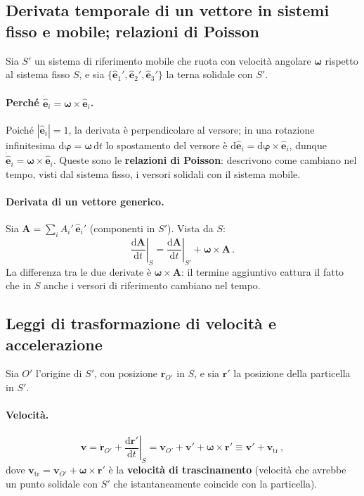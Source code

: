 \documentclass[11pt,a4paper]{article}
\renewcommand{\vec}[1]{\bm{#1}}
\newcommand{\om}{\vec{\omega}}
\theoremstyle{plain}
\theoremstyle{definition}
\theoremstyle{remark}
\begin{document}
\subsection{Derivata temporale di un vettore in sistemi fisso e mobile;
relazioni di Poisson}

Sia $S'$ un sistema di riferimento mobile che ruota con velocità angolare
$\om$ rispetto al sistema fisso $S$, e sia $\{\hat{\bm{e}}_1',\hat{\bm{e}}_2',\hat{\bm{e}}_3'\}$
la terna solidale con $S'$.

\paragraph{Perché $\dot{\hat{\bm{e}}}_i=\om\times\hat{\bm{e}}_i$.}
Poiché $|\hat{\bm{e}}_i|=1$, la derivata è perpendicolare al versore; in una
rotazione infinitesima $\mathrm{d}\vec{\varphi}=\om\,\mathrm{d}t$ lo
spostamento del versore è $\mathrm{d}\hat{\bm{e}}_i=\mathrm{d}\vec{\varphi}\times\hat{\bm{e}}_i$,
dunque $\dot{\hat{\bm{e}}}_i=\om\times\hat{\bm{e}}_i$.
Queste sono le \textbf{relazioni di Poisson}: descrivono come cambiano nel
tempo, visti dal sistema fisso, i versori solidali con il sistema mobile.

\paragraph{Derivata di un vettore generico.}
Sia $\vec{A}=\sum_i A_i'\,\hat{\bm{e}}_i'$ (componenti in $S'$). Vista da $S$:
\[
  \left.\frac{\mathrm{d}\vec{A}}{\mathrm{d}t}\right|_S
  =\left.\frac{\mathrm{d}\vec{A}}{\mathrm{d}t}\right|_{S'}+\om\times\vec{A}\,.
\]
La differenza tra le due derivate è $\om\times\vec{A}$: il termine aggiuntivo
cattura il fatto che in $S$ anche i versori di riferimento cambiano nel tempo.

\subsection{Leggi di trasformazione di velocità e accelerazione}

Sia $O'$ l'origine di $S'$, con posizione $\vec{r}_{O'}$ in $S$, e sia
$\vec{r}'$ la posizione della particella in $S'$.

\paragraph{Velocità.}
\[
  \vec{v}=\dot{\vec{r}}_{O'}+\left.\frac{\mathrm{d}\vec{r}'}{\mathrm{d}t}\right|_S
         =\vec{v}_{O'}+\vec{v}'+\om\times\vec{r}'
         \equiv \vec{v}'+\vec{v}_\mathrm{tr}\,,
\]
dove $\vec{v}_\mathrm{tr}=\vec{v}_{O'}+\om\times\vec{r}'$ è la
\textbf{velocità di trascinamento} (velocità che avrebbe un punto solidale con
$S'$ che istantaneamente coincide con la particella).
\end{document}
